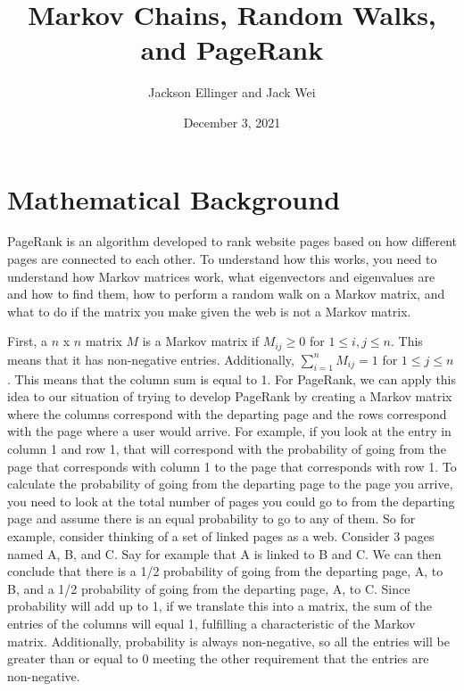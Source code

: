 \documentclass{article}
\title{Markov Chains, Random Walks, and PageRank}
\author{Jackson Ellinger and Jack Wei}
\date{December 3, 2021}
\begin{document}
\maketitle


\section{Mathematical Background}
PageRank is an algorithm developed to rank website pages based on how different pages are connected to each other. To understand how this works, you need to understand how Markov matrices work, what eigenvectors and eigenvalues are and how to find them, how to perform a random walk on a Markov matrix, and what to do if the matrix you make given the web is not a Markov matrix. 

First, a $n$ x $n$ matrix $M$ is a Markov matrix if $M_{ij} \geq 0$ for $1 \leq i, j \leq n$. This means that it has non-negative entries. Additionally, $\sum_{i = 1}^{n} M_{ij} = 1$ for $1 \leq j \leq n$. This means that the column sum is equal to 1. For PageRank, we can apply this idea to our situation of trying to develop PageRank by creating a Markov matrix where the columns correspond with the departing page and the rows correspond with the page where a user would arrive. For example, if you look at the entry in column 1 and row 1, that will correspond with the probability of going from the page that corresponds with column 1 to the page that corresponds with row 1. To calculate the probability of going from the departing page to the page you arrive, you need to look at the total number of pages you could go to from the departing page and assume there is an equal probability to go to any of them. So for example, consider thinking of a set of linked pages as a web. Consider 3 pages named A, B, and C. Say for example that A is linked to B and C. We can then conclude that there is a 1/2 probability of going from the departing page, A, to B, and a 1/2 probability of going from the departing page, A, to C. Since probability will add up to 1, if we translate this into a matrix, the sum of the entries of the columns will equal 1, fulfilling a characteristic of the Markov matrix. Additionally, probability is always non-negative, so all the entries will be greater than or equal to 0 meeting the other requirement that the entries are non-negative.
\end{document}
